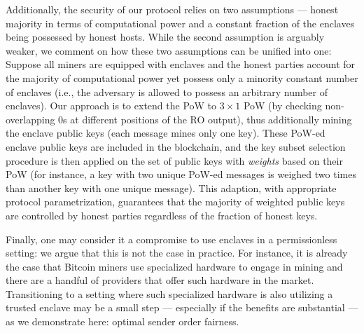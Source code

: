 Additionally, the security of our protocol relies on two assumptions --- honest majority in terms of computational power and a constant fraction of the enclaves being possessed by honest hosts.
%
While the second assumption is arguably weaker, we comment on how these two assumptions can be unified into one:
%
Suppose all miners are equipped with enclaves and the honest parties account for the majority of computational power yet possess only a minority constant number of enclaves (i.e., the adversary is allowed to possess an arbitrary number of enclaves).
%
Our approach is to extend the \twoforone PoW to $3 {\times} 1$ PoW (by checking non-overlapping 0s at different positions of the RO output), thus additionally mining the enclave public keys (each message mines only one key).
%
These PoW-ed enclave public keys are included in the blockchain, and the key subset selection procedure is then applied on the set of public keys with \emph{weights} based on their PoW (for instance, a key with two unique PoW-ed messages is weighed two times than another key with one unique message).
%
This adaption, with appropriate protocol parametrization, guarantees that the majority of weighted public keys are controlled by honest parties regardless of the fraction of honest keys.

Finally, one may consider it a compromise to use enclaves in a permissionless setting: we argue that this is not the case in practice.
%
For instance, it is already the case that Bitcoin miners use specialized hardware to engage in mining and there are a handful of providers that offer such hardware in the market.
%
Transitioning to a setting where such specialized hardware is also utilizing a trusted enclave may be a small step --- especially if the benefits are substantial --- as we demonstrate here: optimal sender order fairness.
